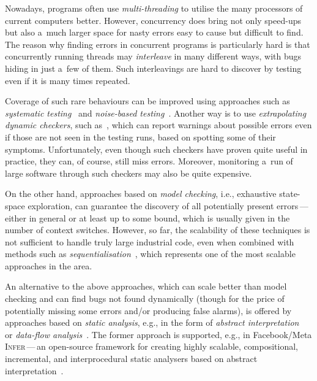 \documentclass[runningheads]{llncs}
\begin{document}
Nowadays, programs often use \emph{multi-threading} to utilise the many
processors of current computers better. However, concurrency does bring not
only speed-ups but also a~much larger space for nasty errors easy to cause
but difficult to find. The reason why finding errors in concurrent programs
is particularly hard is that concurrently running threads may
\emph{interleave} in many different ways, with bugs hiding in just a~few of
them. Such interleavings are hard to discover by testing even if
it is many times repeated.

Coverage of such rare behaviours can be improved using approaches such
as \emph{systematic testing}~\cite{schedspec12} and \emph{noise-based
testing}~\cite{contestframework03,noise15,anaconda}.
Another way is to use \emph{extrapolating dynamic checkers}, such
as~\cite{fasttrack09,velodrome08}, which can report warnings about possible
errors even if those are not seen in the testing runs, based on spotting
some of their symptoms. Unfortunately, even though such checkers have
proven quite useful in practice, they can, of course, still miss errors.
Moreover, monitoring a~run of large software through such checkers may also
be quite expensive.

On the other hand, approaches based on \emph{model checking}, i.e., exhaustive
state-space exploration, can guarantee the discovery of all potentially
present errors\,---\,either in general or at least up to some bound, which
is usually given in the number of context switches. However, so far, the
scalability of these techniques is not sufficient to handle truly large
industrial code, even when combined with methods such as
\emph{sequentialisation}~\cite{lal-reps-08,lazy-seq-16}, which represents
one of the most scalable approaches in the area.

\enlargethispage{4mm}


An alternative to the above approaches, which can scale better than model
checking and can find bugs not found dynamically (though for the price of
potentially missing some errors and/or producing false alarms), is offered by
approaches based on \emph{static analysis}, e.g., in the form of \emph{abstract
interpretation}~\cite{ai77} or \emph{data-flow analysis}~\cite{dfa73}. The
former approach is supported, e.g., in Facebook/Meta \textsc{Infer}\,---\,an
open-source framework for creating highly scalable, compositional,
incremental, and interprocedural static analysers based on abstract
interpretation~\cite{inferNFM15}.
\end{document}
